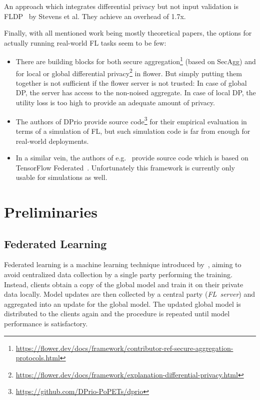 \documentclass{article}
\begin{document}
An approach which integrates differential privacy but not input validation
is FLDP~\cite{Stevens2021EfficientDP} by Stevens et al. They achieve an overhead
of 1.7x.

Finally, with all mentioned work being mostly theoretical papers, the
options for actually running real-world FL tasks seem to be few:
\begin{itemize}
  \setlength\itemsep{0em}
\item There are building blocks for both secure aggregation\footnote{\url{https://flower.dev/docs/framework/contributor-ref-secure-aggregation-protocols.html}}
  (based on SecAgg) and for local or global differential privacy\footnote{\url{https://flower.dev/docs/framework/explanation-differential-privacy.html}} in flower. But
  simply putting them together is not sufficient if the flower server is not trusted: In case of global DP, the
  server has access to the non-noised aggregate. In case of local DP, the
  utility loss is too high to provide an adequate amount of privacy.
\item The authors of DPrio provide source code\footnote{\url{https://github.com/DPrio-PoPETs/dprio}} for their empirical evaluation in
  terms of a simulation of FL, but such simulation code is far from enough for
  real-world deployments.
\item In a similar vein, the authors of e.g.~\cite{Kairouz2021TheDD} provide
  source code which is based on TensorFlow Federated~\cite{tff}. Unfortunately this
  framework is currently only usable for simulations as well.
\end{itemize}


\section{Preliminaries}

\subsection{Federated Learning}
Federated learning is a machine learning technique introduced
by~\citet{FL}, aiming to avoid centralized data collection by a single
party performing the training. Instead, clients obtain a copy of
the global model and train it on their private data locally. Model updates are
then collected by a central party (\emph{FL~server}) and aggregated into an update for
the global model. The updated global model is distributed to the clients again and the
procedure is repeated until model performance is satisfactory.
\end{document}
